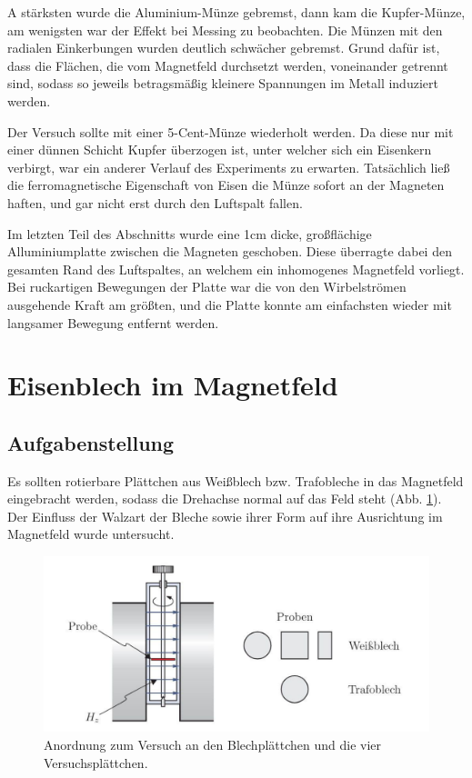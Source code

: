 \documentclass[a4paper,twoside,12pt,DIV=13,BCOR=5mm,numbers=noenddot,cleardoublepage=empty]{scrbook}
\begin{document}
\noindent A stärksten wurde die Aluminium-Münze gebremst, dann kam die Kupfer-Münze, am wenigsten war der Effekt bei Messing zu beobachten. Die Münzen mit den radialen Einkerbungen wurden deutlich schwächer gebremst. Grund dafür ist, dass die Flächen, die vom Magnetfeld durchsetzt werden, voneinander getrennt sind, sodass so jeweils betragsmäßig kleinere Spannungen im Metall induziert werden. 

\noindent Der Versuch sollte mit einer 5-Cent-Münze wiederholt werden. Da diese nur mit einer dünnen Schicht Kupfer überzogen ist, unter welcher sich ein Eisenkern verbirgt, war ein anderer Verlauf des Experiments zu erwarten. Tatsächlich ließ die ferromagnetische Eigenschaft von Eisen die Münze sofort an der Magneten haften, und gar nicht erst durch den Luftspalt fallen.

\noindent Im letzten Teil des Abschnitts wurde eine 1cm dicke, großflächige Alluminiumplatte zwischen die Magneten geschoben. Diese überragte dabei den gesamten Rand des Luftspaltes, an welchem ein inhomogenes Magnetfeld vorliegt. Bei ruckartigen Bewegungen der Platte war die von den Wirbelströmen ausgehende Kraft am größten, und die Platte konnte am einfachsten wieder mit langsamer Bewegung entfernt werden.

\section{Eisenblech im Magnetfeld}
\subsection{Aufgabenstellung}
Es sollten rotierbare Plättchen aus Weißblech bzw. Trafobleche in das Magnetfeld eingebracht werden, sodass die Drehachse normal auf das Feld steht (Abb. \ref{fig: RottierbarePlaettchen}). Der Einfluss der Walzart der Bleche sowie ihrer Form auf ihre Ausrichtung im Magnetfeld wurde untersucht. 
\begin{figure}
    \centering
    \includegraphics[scale=0.5]{pictures/Anordnung Blechproben.pdf}
    \caption{Anordnung zum Versuch an den Blechplättchen und die vier Versuchsplättchen.}
    \label{fig: RottierbarePlaettchen}
\end{figure}
\end{document}
